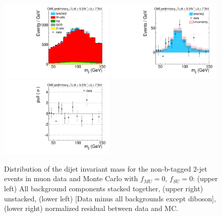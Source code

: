 \begin{figure}[h!]
  {\centering
    \includegraphics[width=0.49\textwidth]{figs/ScaleAndMatchingCrossChecks/mu2JNoBTag_fSU0fMU0/Wjj_Diboson_Muon_2jets_Stacked.pdf}
    \includegraphics[width=0.49\textwidth]{figs/ScaleAndMatchingCrossChecks/mu2JNoBTag_fSU0fMU0/Wjj_Diboson_Muon_2jets_Subtracted.pdf}
    \includegraphics[width=0.49\textwidth]{figs/ScaleAndMatchingCrossChecks/mu2JNoBTag_fSU0fMU0/Wjj_Diboson_Muon_2jets_Pull.pdf}
    \caption{Distribution of the dijet invariant mass for the non-b-tagged 2-jet events in muon data and Monte Carlo with $f_{MU}=0$, $f_{SU}=0$: 
      (upper left) All background components stacked together, 
      (upper right) unstacked, (lower left) [Data minus all backgrounds except diboson],  
      (lower right) normalized residual between data and MC. }
    \label{fig:fsufmuXcheck_fSU0fMU0}}
\end{figure}
